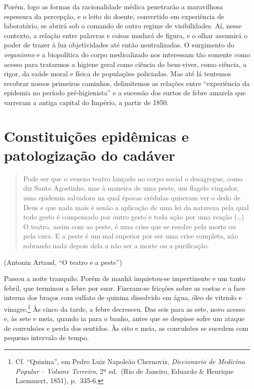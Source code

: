 Porém, logo as formas da racionalidade médica penetrarão a maravilhosa
espessura da percepção, e o leito do doente, convertido em experiência
de laboratório, se abrirá sob o comando de outro regime de
visibilidades. Aí, nesse contexto, a relação entre palavras e coisas
mudará de figura, e o olhar assumirá o poder de trazer à luz
objetividades até então neutralizadas. O surgimento do \emph{organismo}
e a biopolítica do corpo medicalizado nos interessam tão somente como
acesso para tratarmos a higiene geral como ciência do bem-viver, como
ciência, a rigor, da saúde moral e física de populações policiadas. Mas
até lá tentemos recobrar nossos primeiros caminhos, delimitemos as
relações entre ``experiência da epidemia no período pré-higienista'' e a
sucessão dos surtos de febre amarela que varreram a antiga capital do
Império, a partir de 1850.

\section*{Constituições epidêmicas e patologização do
cadáver}

\begin{quote}
Pode ser que o veneno teatro lançado no corpo social o desagregue, como
diz Santo Agostinho, mas à maneira de uma peste, um flagelo vingador,
uma epidemia salvadora na qual épocas crédulas quiseram ver o dedo de
Deus e que nada mais é senão a aplicação de uma lei da natureza pela
qual todo gesto é compensado por outro gesto e toda ação por uma reação
(\ldots{}) O teatro, assim com ao peste, é uma crise que se resolve pela
morte ou pela cura. E a peste é um mal superior por ser uma crise
completa, não sobrando nada depois dela a não ser a morte ou a
purificação.
\end{quote}

(Antonin Artaud, ``O teatro e a peste'')

Passou a noite tranquilo. Porém de manhã inquietou-se impertinente e um
tanto febril, que terminou a febre por suor. Fizeram-se fricções sobre
as costas e a face interna dos braços com sulfato de quinina dissolvido
em água, óleo de vitriolo e vinagre.\footnote{Cf. ``Quinina'', em Pedro
  Luiz Napoleão Chernoviz, \emph{Diccionario de Medicina Popular} --
  \emph{Volume Terceiro}, 2ª ed.~(Rio de Janeiro, Eduardo \& Henrique
  Laemmert, 1851), p.~335-6.} Às cinco da tarde, a febre decresceu. Das
seis para as sete, novo acesso e, às sete e meia, quando ia para o
banho, antes que se despisse sofre um ataque de convulsões e perda dos
sentidos. Às oito e meia, as convulsões se sucedem com pequeno intervalo
de tempo.

